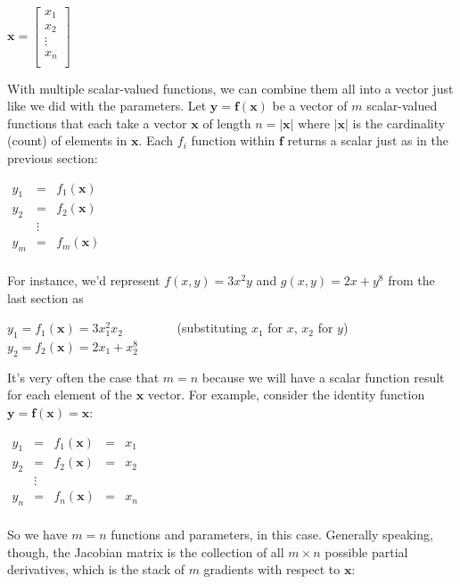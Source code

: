 \documentclass[11pt]{article}
\begin{document}
$\mathbf{x} = \begin{bmatrix}
           x_1\\
           x_2\\
           \vdots \\
           x_n\\
           \end{bmatrix}$

With multiple scalar-valued functions, we can combine them all into a vector just like we did with the parameters. Let $\mathbf{y} = \mathbf{f}(\mathbf{x})$ be a vector of $m$ scalar-valued functions that each take a vector $\mathbf{x}$ of length $n=|\mathbf{x}|$ where $|\mathbf{x}|$ is the cardinality (count) of elements in $\mathbf{x}$. Each $f_i$ function within $\mathbf{f}$ returns a scalar just as in the previous section:

$
\begin{array}{lcl}
y_1 & = & f_1(\mathbf{x})\\
y_2 & = & f_2(\mathbf{x})\\
 & \vdots & \\
y_m & = & f_m(\mathbf{x})\\
\end{array}
$

For instance, we'd represent $f(x,y) = 3x^2y$ and $g(x,y) = 2x + y^8$ from the last section as

$y_1 = f_1(\mathbf{x}) = 3x_1^2x_2$ ~~~~~~~~(substituting $x_1$ for $x$, $x_2$ for $y$)\\
$y_2 = f_2(\mathbf{x}) = 2x_1 + x_2^8$

It's very often the case that $m=n$ because we will have a scalar function result for each element of the $\mathbf{x}$ vector.  For example, consider the identity function $\mathbf{y} = \mathbf{f(x)} = \mathbf{x}$:

$
\begin{array}{lclcc}
y_1 & = & f_1(\mathbf{x})& = & x_1\\
y_2 & = & f_2(\mathbf{x})& = & x_2\\
 & \vdots & \\
y_n & = & f_n(\mathbf{x})& = & x_n\\
\end{array}
$

So we have $m=n$ functions and parameters, in this case. Generally speaking, though, the Jacobian matrix is the collection of all $m \times n$ possible partial derivatives, which is the stack of $m$ gradients with respect to $\mathbf{x}$:
\end{document}
